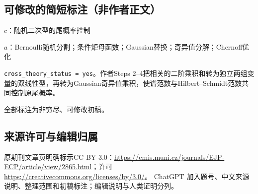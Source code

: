\documentclass[UTF8,11pt]{ctexart}
\theoremstyle{definition}
\begin{document}
\subsection*{可修改的简短标注（非作者正文）}
$c$：随机二次型的尾概率控制

$a$：Bernoulli随机分割；条件矩母函数；Gaussian替换；奇异值分解；Chernoff优化

\texttt{cross\_theory\_status = yes}。作者Steps 2--4把相关的二阶乘积和转为独立两组变量的双线性型，再转为Gaussian奇异值乘积，使谱范数与Hilbert--Schmidt范数共同控制原尾概率。

全部标注为非穷尽、可修改初稿。
\subsection*{来源许可与编辑归属}
原期刊文章页明确标示CC BY 3.0：\url{https://emis.muni.cz/journals/EJP-ECP/article/view/2865.html}；许可\url{https://creativecommons.org/licenses/by/3.0/}。
ChatGPT 加入题号、中文来源说明、整理范围和初稿标注；编辑说明与人类证明分列。
\end{document}
